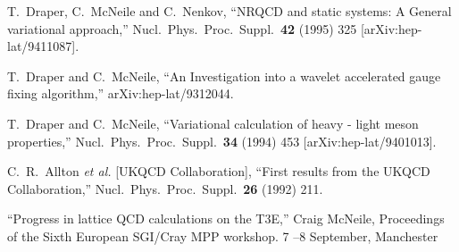 \begin{thebibliography}{130}
T.~Draper, C.~McNeile and C.~Nenkov,
``NRQCD and static systems: A General variational approach,''
Nucl.\ Phys.\ Proc.\ Suppl.\  {\bf 42} (1995) 325
[arXiv:hep-lat/9411087].

T.~Draper and C.~McNeile,
``An Investigation into a wavelet accelerated gauge fixing algorithm,''
arXiv:hep-lat/9312044.

T.~Draper and C.~McNeile,
``Variational calculation of heavy - light meson properties,''
Nucl.\ Phys.\ Proc.\ Suppl.\  {\bf 34} (1994) 453
[arXiv:hep-lat/9401013].

C.~R.~Allton {\it et al.}  [UKQCD Collaboration],
``First results from the UKQCD Collaboration,''
Nucl.\ Phys.\ Proc.\ Suppl.\  {\bf 26} (1992) 211.


``Progress in lattice QCD calculations on the T3E,'' Craig McNeile,
Proceedings of the
   Sixth European SGI/Cray MPP workshop. 7 --8 September, Manchester



\end{thebibliography}
